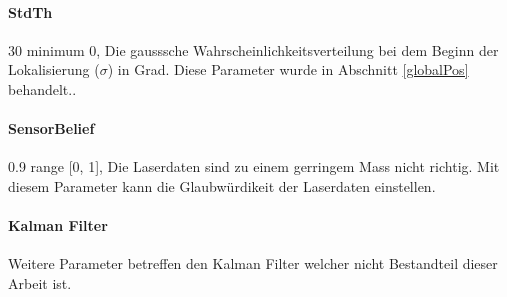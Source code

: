 \documentclass{article}
\begin{document}
\paragraph{StdTh} 30                  minimum 0,   Die gausssche Wahrscheinlichkeitsverteilung bei dem Beginn der Lokalisierung ($\sigma$) in Grad. Diese Parameter wurde in Abschnitt \ref{globalPos} behandelt..

\paragraph{SensorBelief} 0.9          range [0, 1],  Die Laserdaten sind zu einem gerringem Mass nicht richtig. Mit diesem Parameter kann die Glaubw\"urdikeit der Laserdaten einstellen. 


\paragraph{Kalman Filter}
Weitere Parameter betreffen den Kalman Filter welcher nicht Bestandteil dieser Arbeit ist. 
\end{document}
